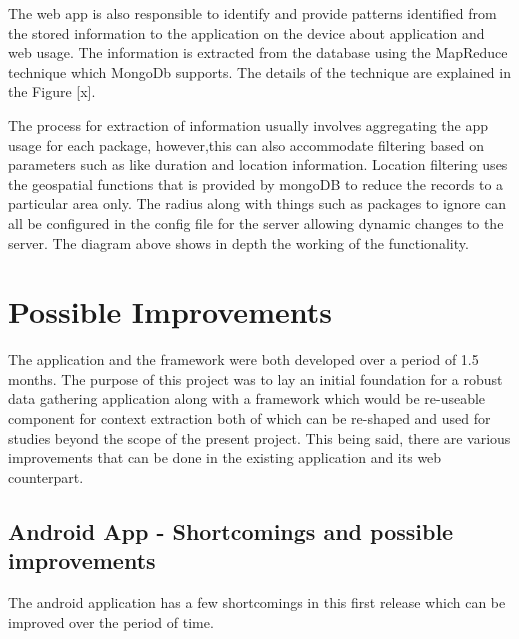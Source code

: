 \documentclass[12pt]{report}
\begin{document}
The web app is also responsible to identify and provide patterns identified from the stored information to the application on the device about application and web usage. The information is extracted from the database using the MapReduce technique which MongoDb supports. The details of the technique are explained in the Figure [x].

The process for extraction of information usually involves aggregating the app usage for each package, however,this can also accommodate filtering based on parameters such as like duration and location information. Location filtering uses the geospatial functions that is provided by mongoDB to reduce the records to a particular area only. The radius along with things such as packages to ignore can all be configured in the config file for the server allowing dynamic changes to the server. The diagram above shows in depth the working of the functionality.

\section{Possible Improvements}

The application and the framework were both developed over a period of 1.5 months. The purpose of this project was to lay an initial foundation for a robust data gathering application along with a framework which would be re-useable component for context extraction both of which can be re-shaped and used for studies beyond the scope of the present project. This being said, there are various improvements that can be done in the existing application and its web counterpart.

\subsection{Android App - Shortcomings and possible improvements}

The android application has a few shortcomings in this first release which can be improved over the period of time. 
\end{document}
